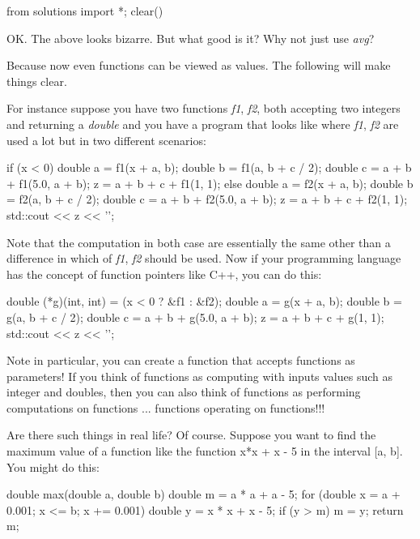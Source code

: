\begin{python0}
from solutions import *; clear()
\end{python0}

OK. The above looks bizarre. But what good is it? Why not just use
\textit{avg}?

Because now even functions can be viewed as values. The following will
make things clear.

For instance suppose you have two functions \textit{f1}, \textit{f2}, both
accepting two integers and returning a \textit{double} and you have a
program that looks like where \textit{f1}, \textit{f2} are used a lot but in
two different scenarios:

\begin{consolethree}[escapeinside=||]
if (x < 0)
{
    double a = f1(x + a, b);
    double b = f1(a, b + c / 2);
    double c = a + b + f1(5.0, a + b);
    z = a + b + c + f1(1, 1);
}
else
{
    double a = f2(x + a, b);
    double b = f2(a, b + c / 2);
    double c = a + b + f2(5.0, a + b);
    z = a + b + c + f2(1, 1);
}
std::cout << z << '\n';
\end{consolethree}

Note that the computation in both case are essentially the same other
than a difference in which of \textit{f1}, \textit{f2} should be used. Now
if your programming language has the concept of function pointers like
C++, you can do this:

\begin{consolethree}[escapeinside=||]
double (*g)(int, int) = (x < 0 ? &f1 : &f2);
double a = g(x + a, b);
double b = g(a, b + c / 2);
double c = a + b + g(5.0, a + b);
z = a + b + c + g(1, 1);
std::cout << z << '\n';
\end{consolethree}

Note in particular, you can create a function that accepts functions as
parameters! If you think of functions as computing with inputs values
such as integer and doubles, then you can also think of functions as
performing computations on functions ... functions operating on
functions!!!

Are there such things in real life? Of course. Suppose you want to find
the maximum value of a function like the function x*x + x - 5 in the
interval [a, b]. You might do this:

\begin{consolethree}[escapeinside=||]
double max(double a, double b)
{
    double m = a * a + a - 5;
    for (double x = a + 0.001; x <= b; x += 0.001)
    {
        double y = x * x + x - 5;
        if (y > m)
        {
            m = y;
        }
    }
    return m;
}
\end{consolethree}

